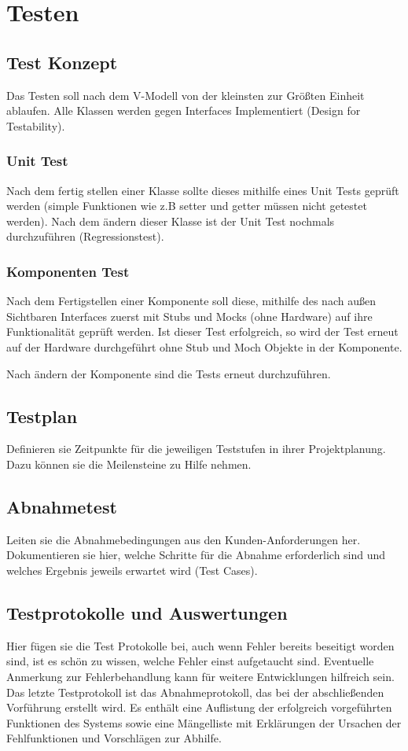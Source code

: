 \chapter{Testen}

\section{Test Konzept}
Das Testen soll nach dem V-Modell von der kleinsten zur Größten Einheit ablaufen.
Alle Klassen werden gegen Interfaces Implementiert (Design for Testability).

\subsection{Unit Test}
Nach dem fertig stellen einer Klasse sollte dieses mithilfe eines Unit Tests geprüft werden (simple Funktionen wie z.B setter und getter müssen nicht getestet werden).
Nach dem ändern dieser Klasse ist der Unit Test nochmals durchzuführen (Regressionstest).

\subsection{Komponenten Test}
Nach dem Fertigstellen einer Komponente soll diese, mithilfe des nach außen Sichtbaren Interfaces zuerst mit Stubs und Mocks (ohne Hardware) auf ihre Funktionalität geprüft werden.
Ist dieser Test erfolgreich, so wird der Test erneut auf der Hardware durchgeführt ohne Stub und Moch Objekte in der Komponente. 

Nach ändern der Komponente sind die Tests erneut durchzuführen.



\section{Testplan}

Definieren sie Zeitpunkte für die jeweiligen Teststufen in ihrer
Projektplanung. Dazu können sie die Meilensteine zu Hilfe nehmen.

\section{Abnahmetest}

Leiten sie die Abnahmebedingungen aus den Kunden-Anforderungen her.
Dokumentieren sie hier, welche Schritte für die Abnahme erforderlich
sind und welches Ergebnis jeweils erwartet wird (Test Cases).

\section{Testprotokolle und Auswertungen}

Hier fügen sie die Test Protokolle bei, auch wenn Fehler bereits
beseitigt worden sind, ist es schön zu wissen, welche Fehler einst
aufgetaucht sind. Eventuelle Anmerkung zur Fehlerbehandlung kann für
weitere Entwicklungen hilfreich sein.
Das letzte Testprotokoll ist das Abnahmeprotokoll, das bei der
abschließenden Vorführung erstellt wird. Es enthält eine Auflistung der
erfolgreich vorgeführten Funktionen des Systems sowie eine Mängelliste
mit Erklärungen der Ursachen der Fehlfunktionen und Vorschlägen zur
Abhilfe.
